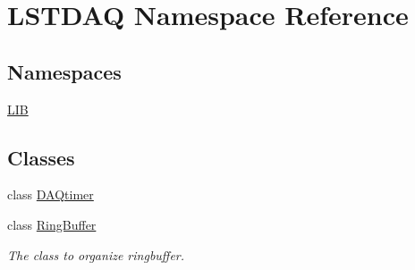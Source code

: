 \hypertarget{namespaceLSTDAQ}{}\section{L\+S\+T\+D\+AQ Namespace Reference}
\label{namespaceLSTDAQ}
\subsection*{Namespaces}
\begin{DoxyCompactItemize}
\item 
 \hyperlink{namespaceLSTDAQ_1_1LIB}{L\+IB}
\end{DoxyCompactItemize}
\subsection*{Classes}
\begin{DoxyCompactItemize}
\item 
class \hyperlink{classLSTDAQ_1_1DAQtimer}{D\+A\+Qtimer}
\item 
class \hyperlink{classLSTDAQ_1_1RingBuffer}{Ring\+Buffer}
\begin{DoxyCompactList}\small\item\em The class to organize ringbuffer. \end{DoxyCompactList}\end{DoxyCompactItemize}

